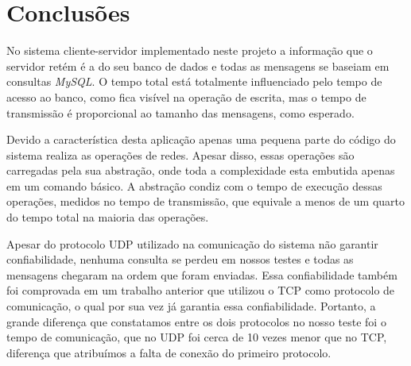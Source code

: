 \documentclass[12pt,a4paper]{article}
\begin{document}
\section{Conclusões}

No sistema cliente-servidor implementado neste projeto a informação que o servidor retém é a do seu banco de dados e todas as mensagens se baseiam em consultas {\it MySQL}. O tempo total está totalmente influenciado pelo tempo de acesso ao banco, como fica visível na operação de escrita, mas o tempo de transmissão é proporcional ao tamanho das mensagens, como esperado.

Devido a característica desta aplicação apenas uma pequena parte do código do sistema realiza as operações de redes. Apesar disso, essas operações são carregadas pela sua abstração, onde toda a complexidade esta embutida apenas em um comando básico. A abstração condiz com o tempo de execução dessas operações, medidos no tempo de transmissão, que equivale a menos de um quarto do tempo total na maioria das operações.

Apesar do protocolo UDP utilizado na comunicação do sistema não garantir confiabilidade, nenhuma consulta se perdeu em nossos testes e todas as mensagens chegaram na ordem que foram enviadas. Essa confiabilidade também foi comprovada em um trabalho anterior que utilizou o TCP como protocolo de comunicação, o qual por sua vez já garantia essa confiabilidade. Portanto, a grande diferença que constatamos entre os dois protocolos no nosso teste foi o tempo de comunicação, que no UDP foi cerca de 10 vezes menor que no TCP, diferença que atribuímos a falta de conexão do primeiro protocolo.


\singlespace


\end{document}

